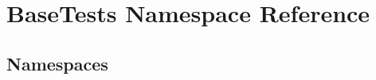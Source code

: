 \hypertarget{namespace_base_tests}{}\section{Base\+Tests Namespace Reference}
\label{namespace_base_tests}
\subsection*{Namespaces}
\begin{DoxyCompactItemize}
\end{DoxyCompactItemize}
